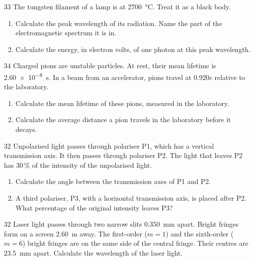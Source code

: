 \begin{practiceq}{3}{3}\label{pq:filament}
The tungsten filament of a lamp is at \qty{2700}{\degreeCelsius}. Treat it as a black body.
\begin{enumerate}[label=(\alph*)]
  \item Calculate the peak wavelength of its radiation. Name the part of the electromagnetic
        spectrum it is in. 
  \item Calculate the energy, in electron volts, of one photon at this peak wavelength.
\end{enumerate}
\end{practiceq}

\begin{practiceq}{3}{4}\label{pq:pions}
Charged pions are unstable particles. At rest, their mean lifetime is \qty{2.60e-8}{s}. In a
beam from an accelerator, pions travel at $0.920c$ relative to the laboratory.
\begin{enumerate}[label=(\alph*)]
  \item Calculate the mean lifetime of these pions, measured in the laboratory.
  \item Calculate the average distance a pion travels in the laboratory before it decays.
\end{enumerate}
\end{practiceq}

\begin{practiceq}{3}{2}\label{pq:thirty}
Unpolarised light passes through polariser P1, which has a vertical transmission axis. It then
passes through polariser P2. The light that leaves P2 has 30\,\% of the intensity of the
unpolarised light.
\begin{enumerate}[label=(\alph*)]
  \item Calculate the angle between the transmission axes of P1 and P2. 
  \item A third polariser, P3, with a horizontal transmission axis, is placed after P2. What
        percentage of the original intensity leaves P3? 
\end{enumerate}
\end{practiceq}

\begin{practiceq}{3}{2}\label{pq:doubleslit}
Laser light passes through two narrow slits \qty{0.350}{mm} apart. Bright fringes form on a
screen \qty{2.60}{m} away. The first-order ($m = 1$) and the sixth-order ($m = 6$) bright
fringes are on the same side of the central fringe. Their centres are \qty{23.5}{mm} apart.
Calculate the wavelength of the laser light.
\end{practiceq}

